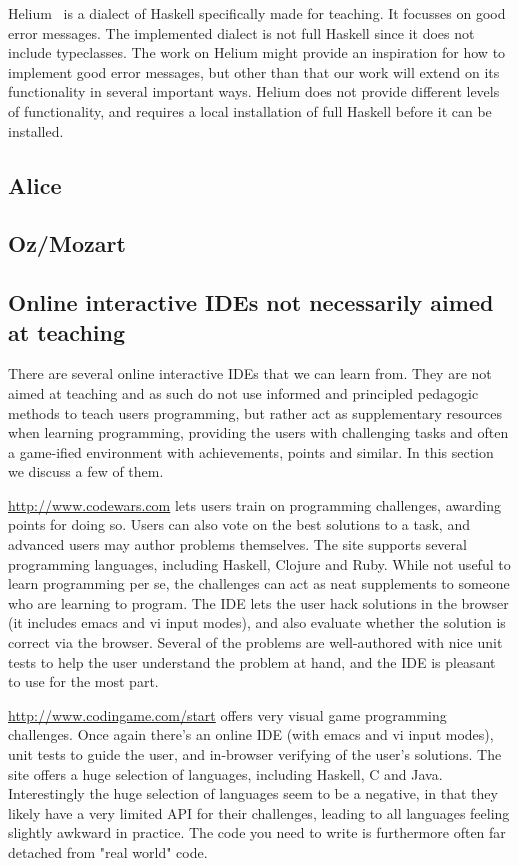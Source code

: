 Helium~\cite{DBLP:conf/haskell/HeerenLI03} is a dialect of Haskell specifically
made for teaching. It focusses on good error messages. The implemented dialect
is not full Haskell since it does not include typeclasses. The work on Helium
might provide an inspiration for how to implement good error messages, but other
than that our work will extend on its functionality in several important ways.
Helium does not provide different levels of functionality, and requires a local
installation of full Haskell before it can be installed.

\subsection{Alice}

\subsection{Oz/Mozart}

\subsection{Online interactive IDEs not necessarily aimed at teaching}
There are several online interactive IDEs that we can learn from. They are not 
aimed at teaching and as such do not use informed and principled pedagogic 
methods to teach users programming, but rather act as supplementary resources 
when learning programming, providing the users with challenging tasks and 
often a game-ified environment with achievements, points and similar. In this 
section we discuss a few of them.

\url{http://www.codewars.com} lets users train on programming challenges, 
awarding points for doing so. Users can also vote on the best solutions to a 
task, and advanced users may author problems themselves. The site supports 
several programming languages, including Haskell, Clojure and Ruby. While not 
useful to learn programming per se, the challenges can act as neat supplements 
to someone who are learning to program. The IDE lets the user hack solutions 
in the browser (it includes emacs and vi input modes), and also evaluate 
whether the solution is correct via the browser. Several of the problems are 
well-authored with nice unit tests to help the user understand the problem at 
hand, and the IDE is pleasant to use for the most part.

\url{http://www.codingame.com/start} offers very visual game programming 
challenges. Once again there's an online IDE (with emacs and vi input modes), 
unit tests to guide the user, and in-browser verifying of the user's 
solutions. The site offers a huge selection of languages, including Haskell, C 
and Java. Interestingly the huge selection of languages seem to be a negative, 
in that they likely have a very limited API for their challenges, leading to 
all languages feeling slightly awkward in practice. The code you need to write 
is furthermore often far detached from "real world" code.

